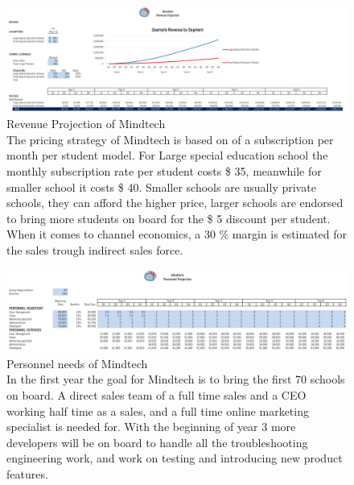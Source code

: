 \documentclass[letterpaper,10pt]{article}
\begin{document}
\begin{appendices}
\begin{landscape}
\begin{figure}[!htb]
\centering
\includegraphics[scale=0.5]{revenue.jpg}
\caption[Revenue Projection of Mindtech]{Revenue Projection of Mindtech \\ The pricing strategy of Mindtech is based on of a subscription per month per student model. For Large special education school the monthly subscription rate per student costs \$ 35, meanwhile for smaller school it costs \$ 40. Smaller schools are usually private schools, they can afford the higher price, larger schools are endorsed to bring more students on board for the \$ 5 discount per student. When it comes to channel economics, a 30 \% margin is estimated for the sales trough indirect sales force. }
\end{figure}
\end{landscape}


\begin{landscape}
\begin{figure}[!htb]
\centering
\includegraphics[scale=0.5]{personell-1.jpg}
\caption[Personnel needs of Mindtech]{Personnel needs of Mindtech \\ In the first year the goal for Mindtech is to bring the first 70 schools on board. A direct sales team of a full time sales and a CEO working half time as a sales, and a full time online marketing specialist is needed for. With the beginning of year 3 more developers will be on board to handle all the troubleshooting engineering work, and work on testing and introducing new product features.}
\end{figure}
\end{landscape}


\end{appendices}
\end{document}
